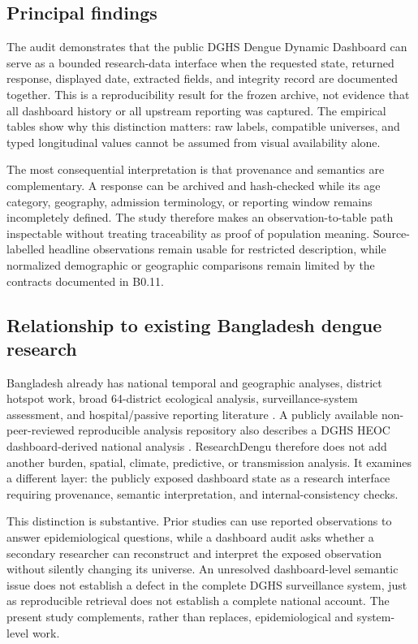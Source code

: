 \subsection{Principal findings}

The audit demonstrates that the public DGHS Dengue Dynamic Dashboard can serve as a bounded research-data interface when the requested state, returned response, displayed date, extracted fields, and integrity record are documented together. This is a reproducibility result for the frozen archive, not evidence that all dashboard history or all upstream reporting was captured. The empirical tables show why this distinction matters: raw labels, compatible universes, and typed longitudinal values cannot be assumed from visual availability alone.

The most consequential interpretation is that provenance and semantics are complementary. A response can be archived and hash-checked while its age category, geography, admission terminology, or reporting window remains incompletely defined. The study therefore makes an observation-to-table path inspectable without treating traceability as proof of population meaning. Source-labelled headline observations remain usable for restricted description, while normalized demographic or geographic comparisons remain limited by the contracts documented in B0.11.

\subsection{Relationship to existing Bangladesh dengue research}

Bangladesh already has national temporal and geographic analyses, district hotspot work, broad 64-district ecological analysis, surveillance-system assessment, and hospital/passive reporting literature \citep{ref1,ref2,ref3,ref4,ref6,ref7}. A publicly available non-peer-reviewed reproducible analysis repository also describes a DGHS HEOC dashboard-derived national analysis \citep{ref5}. ResearchDengu therefore does not add another burden, spatial, climate, predictive, or transmission analysis. It examines a different layer: the publicly exposed dashboard state as a research interface requiring provenance, semantic interpretation, and internal-consistency checks.

This distinction is substantive. Prior studies can use reported observations to answer epidemiological questions, while a dashboard audit asks whether a secondary researcher can reconstruct and interpret the exposed observation without silently changing its universe. An unresolved dashboard-level semantic issue does not establish a defect in the complete DGHS surveillance system, just as reproducible retrieval does not establish a complete national account. The present study complements, rather than replaces, epidemiological and system-level work.


